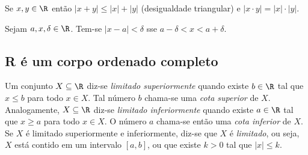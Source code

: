 \documentclass{article}
\begin{document}
\begin{prop}
    Se \(x, y \in \R\) então \(|x+y| \leq |x| + |y|\) (desigualdade triangular) e \(|x \cdot y| = |x| \cdot |y|\).
\end{prop}

\begin{prop}
    Sejam \(a, x, \delta \in \R\). Tem-se \(|x - a| < \delta\) sse \(a - \delta < x < a + \delta\).
\end{prop}

\subsection{R é um corpo ordenado completo}

\begin{defn}
    Um conjunto \(X \subseteq \R\) diz-se \emph{limitado superiormente} quando existe \(b \in \R\) tal que \(x \leq b\) para todo \(x \in X\). Tal número \(b\) chama-se uma \emph{cota superior} de \(X\). Analogamente, \(X \subseteq \R\) diz-se \emph{limitado inferiormente} quando existe \(a \in \R\) tal que \(x \geq a\) para todo \(x \in X\). O número \(a\) chama-se então uma \emph{cota inferior} de \(X\).
    Se \(X\) é limitado superiormente e inferiormente, diz-se que \(X\) é \emph{limitado}, ou seja, \(X\) está contido em um intervalo \([a,b]\), ou que existe \(k > 0\) tal que \(|x| \leq k\).
\end{defn}
\end{document}
